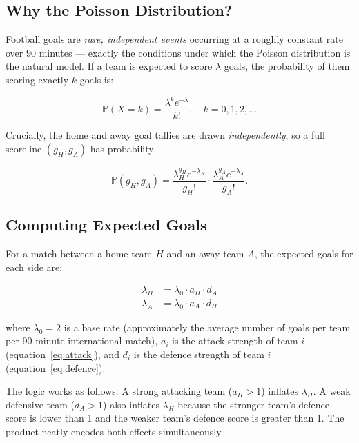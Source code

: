 \documentclass[12pt,a4paper]{article}
\newcommand{\Prob}{\mathbb{P}}
\begin{document}
\subsection{Why the Poisson Distribution?}

Football goals are \emph{rare, independent events} occurring at a roughly
constant rate over 90 minutes --- exactly the conditions under which the
Poisson distribution is the natural model.  If a team is expected to
score $\lambda$ goals, the probability of them scoring exactly $k$ goals
is:

\begin{equation}
  \Prob(X = k) = \frac{\lambda^k e^{-\lambda}}{k!}, \quad k = 0, 1, 2, \ldots
  \label{eq:poisson}
\end{equation}

Crucially, the home and away goal tallies are drawn \emph{independently},
so a full scoreline $(g_H, g_A)$ has probability

\begin{equation}
  \Prob(g_H, g_A) = \frac{\lambda_H^{g_H} e^{-\lambda_H}}{g_H!}
                   \cdot
                   \frac{\lambda_A^{g_A} e^{-\lambda_A}}{g_A!}.
\end{equation}

\subsection{Computing Expected Goals}
\label{sec:goals}

For a match between a home team $H$ and an away team $A$, the expected
goals for each side are:

\begin{align}
  \lambda_H &= \lambda_0 \cdot a_H \cdot d_A \label{eq:lambdaH}\\
  \lambda_A &= \lambda_0 \cdot a_A \cdot d_H \label{eq:lambdaA}
\end{align}

where $\lambda_0 = 2$ is a base rate (approximately the average number of
goals per team per 90-minute international match), $a_i$ is the attack
strength of team $i$ (equation~\ref{eq:attack}), and $d_i$ is the defence
strength of team $i$ (equation~\ref{eq:defence}).

The logic works as follows.  A strong attacking team ($a_H > 1$) inflates
$\lambda_H$.  A weak defensive team ($d_A > 1$) also inflates $\lambda_H$
because the stronger team's defence score is lower than 1 and the weaker
team's defence score is greater than 1.  The product neatly encodes
both effects simultaneously.
\end{document}
